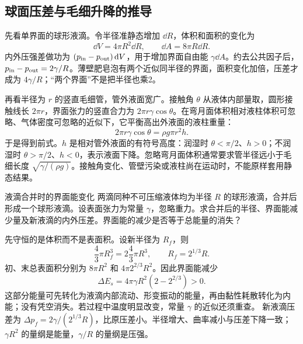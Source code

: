 \subsection{球面压差与毛细升降的推导}
先看单界面的球形液滴。令半径准静态增加 $\dd R$，体积和面积的变化为
\[
 \dd V=4\pi R^2\dd R,\qquad \dd A=8\pi R\dd R.
\]
内外压强差做功为 $(p_{\rm in}-p_{\rm out})\mathop{}\!\mathrm d V$，用于增加界面自由能 $\gamma\dd A$。约去公共因子后，$p_{\rm in}-p_{\rm out}=2\gamma/R$。薄壁肥皂泡有两个近似同半径的界面，面积变化加倍，压差才成为 $4\gamma/R$；“两个界面”不是把半径也乘2。

再看半径为 $r$ 的竖直毛细管，管外液面宽广。接触角 $\theta$ 从液体内部量取，圆形接触线长 $2\pi r$，界面张力的竖直合力为 $2\pi r\gamma\cos\theta$。在弯月面体积相对液柱体积可忽略、气体密度可忽略的近似下，它平衡高出外液面的液柱重量：
\[
 2\pi r\gamma\cos\theta=\rho g\pi r^2h.
\]
于是得到前式。$h$ 是相对管外液面的有符号高度：润湿时 $\theta<\pi/2$、$h>0$；不润湿时 $\theta>\pi/2$、$h<0$，表示液面下降。忽略弯月面体积通常要求管半径远小于毛细长度 $\sqrt{\gamma/(\rho g)}$。接触角变化、管壁污染或液柱尚在运动时，不能原样套用静态结果。

\begin{origexamplebox}{液滴合并时的界面能变化}\label{ch13:ex:teaching-droplets}
两滴同种不可压缩液体均为半径 $R$ 的球形液滴，合并后形成一个球形液滴。设表面张力为常量 $\gamma$，忽略重力。求合并后的半径、界面能减少量及新液滴的内外压差。界面能的减少是否等于总能量的消失？

\ThQDroplets
\end{origexamplebox}
\begin{xesolution}
\ThADroplets

先守恒的是体积而不是表面积。设新半径为 $R_f$，则
\[
 \frac43\pi R_f^3=2\frac43\pi R^3,
 \qquad R_f=2^{1/3}R.
\]
初、末总表面积分别为 $8\pi R^2$ 和 $4\pi 2^{2/3}R^2$。因此界面能减少
\[
 \Delta E_s=4\pi\gamma R^2(2-2^{2/3})>0.
\]
这部分能量可先转化为液滴内部流动、形变振动的能量，再由黏性耗散转化为内能；没有凭空消失。若过程中温度明显改变，常量 $\gamma$ 的近似还须重查。
新液滴压差为 $\Delta p_f=2\gamma/(2^{1/3}R)$，比原压差小。半径增大、曲率减小与压差下降一致；$\gamma R^2$ 的量纲是能量，$\gamma/R$ 的量纲是压强。
\end{xesolution}

